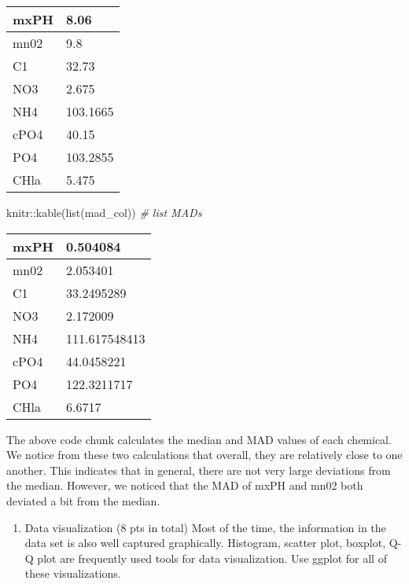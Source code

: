 \documentclass[
]{article}
\newenvironment{Shaded}{\begin{snugshade}}{\end{snugshade}}
\newcommand{\CommentTok}[1]{\textcolor[rgb]{0.56,0.35,0.01}{\textit{#1}}}
\newcommand{\FunctionTok}[1]{\textcolor[rgb]{0.00,0.00,0.00}{#1}}
\newcommand{\NormalTok}[1]{#1}
\newcommand{\SpecialCharTok}[1]{\textcolor[rgb]{0.00,0.00,0.00}{#1}}
\providecommand{\tightlist}{%
  \setlength{\itemsep}{0pt}\setlength{\parskip}{0pt}}
\begin{document}
\begin{table}

\centering
\begin{tabular}[t]{l|l}
\hline
mxPH & 8.06\\
\hline
mn02 & 9.8\\
\hline
C1 & 32.73\\
\hline
NO3 & 2.675\\
\hline
NH4 & 103.1665\\
\hline
cPO4 & 40.15\\
\hline
PO4 & 103.2855\\
\hline
CHla & 5.475\\
\hline
\end{tabular}
\end{table}

\begin{Shaded}
\begin{Highlighting}[]
\NormalTok{knitr}\SpecialCharTok{::}\FunctionTok{kable}\NormalTok{(}\FunctionTok{list}\NormalTok{(mad\_col)) }\CommentTok{\# list MADs}
\end{Highlighting}
\end{Shaded}

\begin{table}

\centering
\begin{tabular}[t]{l|l}
\hline
mxPH & 0.504084\\
\hline
mn02 & 2.053401\\
\hline
C1 & 33.2495289\\
\hline
NO3 & 2.172009\\
\hline
NH4 & 111.617548413\\
\hline
cPO4 & 44.0458221\\
\hline
PO4 & 122.3211717\\
\hline
CHla & 6.6717\\
\hline
\end{tabular}
\end{table}

The above code chunk calculates the median and MAD values of each
chemical. We notice from these two calculations that overall, they are
relatively close to one another. This indicates that in general, there
are not very large deviations from the median. However, we noticed that
the MAD of mxPH and mn02 both deviated a bit from the median.

\begin{enumerate}
\def\labelenumi{\arabic{enumi}.}
\setcounter{enumi}{1}
\tightlist
\item
  Data visualization (8 pts in total) Most of the time, the information
  in the data set is also well captured graphically. Histogram, scatter
  plot, boxplot, Q-Q plot are frequently used tools for data
  visualization. Use ggplot for all of these visualizations.
\end{enumerate}
\end{document}
